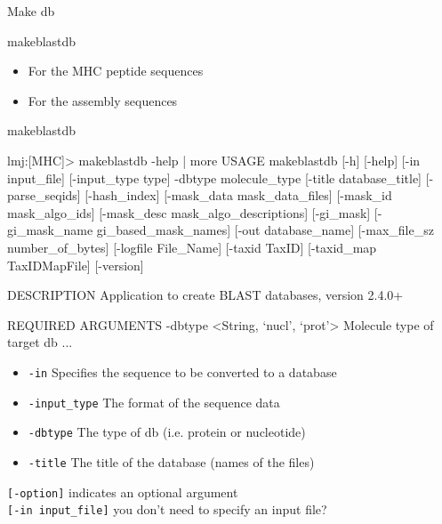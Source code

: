 \documentclass[pdf]{beamer}
\begin{document}
\begin{frame}[fragile]{Make db}
  \begin{consolecode}
    makeblastdb
  \end{consolecode}
  
  \begin{itemize}
  \item For the MHC peptide sequences
  \item For the assembly sequences
  \end{itemize}
\end{frame}

\begin{frame}[fragile]{makeblastdb}
    \begin{consolecode}
      lmj:[MHC]> makeblastdb -help | more
      USAGE                                                                                                                                                                 
      makeblastdb [-h] [-help] [-in input_file] [-input_type type]                                                                                                        
      -dbtype molecule_type [-title database_title] [-parse_seqids]                                                                                                     
      [-hash_index] [-mask_data mask_data_files] [-mask_id mask_algo_ids]                                                                                               
      [-mask_desc mask_algo_descriptions] [-gi_mask]
      [-gi_mask_name gi_based_mask_names] [-out database_name]
      [-max_file_sz number_of_bytes] [-logfile File_Name] [-taxid TaxID]
      [-taxid_map TaxIDMapFile] [-version]
      
      DESCRIPTION
      Application to create BLAST databases, version 2.4.0+
      
      REQUIRED ARGUMENTS
      -dbtype <String, `nucl', `prot'>
      Molecule type of target db
      ...
    \end{consolecode}
    
    \tiny{
      \begin{itemize}
      \item \texttt{-in} Specifies the sequence to be converted to a database
      \item \texttt{-input\_type} The format of the sequence data
      \item \texttt{-dbtype} The type of db (i.e. protein or nucleotide)
      \item \texttt{-title} The title of the database (names of the files)
      \end{itemize}

      \verb|[-option]| indicates an optional argument\\
      \verb|[-in input_file]|  you don't need to specify an input file?
    }
\end{frame}
\end{document}
